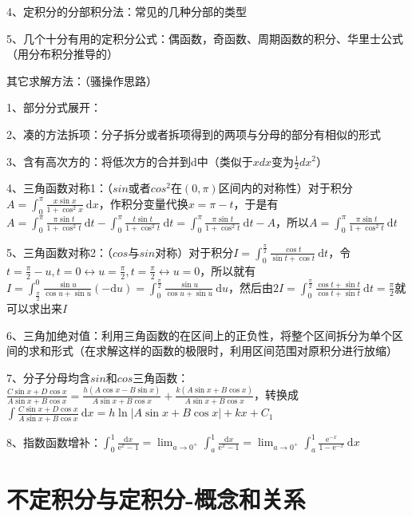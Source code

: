 4、定积分的分部积分法：常见的几种分部的类型

5、几个十分有用的定积分公式：偶函数，奇函数、周期函数的积分、华里士公式（用分布积分推导的）

其它求解方法：（骚操作思路）

1、部分分式展开：

2、凑的方法拆项：分子拆分或者拆项得到的两项与分母的部分有相似的形式

3、含有高次方的：将低次方的合并到d中（类似于$xdx$变为$\frac{1}{2}dx^2$）

4、三角函数对称1：（$sin$或者$cos^2$在$(0,\pi)$区间内的对称性）对于积分$A=\int_{0}^{\pi} \frac{x \sin x}{1+\cos ^{2} x} \mathrm{~d} x$，作积分变量代换$x=\pi-t$，于是有$A=\int_{0}^{\pi} \frac{\pi \sin t}{1+\cos ^{2} t} \mathrm{~d} t-\int_{0}^{\pi} \frac{t \sin t}{1+\cos ^{2} t} \mathrm{~d} t=\int_{0}^{\pi} \frac{\pi \sin t}{1+\cos ^{2} t} \mathrm{~d} t-A$，所以$A=\int_{0}^{\pi} \frac{\pi \sin t}{1+\cos ^{2} t} \mathrm{~d} t$

5、三角函数对称2：（$cos$与$sin$对称）对于积分$I=\int_{0}^{\frac{\pi}{2}} \frac{\cos t}{\sin t+\cos t} \mathrm{~d} t$，令$t=\frac{\pi}{2}-u, t=0 \leftrightarrow u=\frac{\pi}{2}, t=\frac{\pi}{2} \leftrightarrow u=0$，所以就有$I=\int_{\frac{\pi}{2}}^{0} \frac{\sin u}{\cos u+\sin u}(-\mathrm{d} u)=\int_{0}^{\frac{\pi}{2}} \frac{\sin u}{\cos u+\sin u} \mathrm{~d} u$，然后由$2 I=\int_{0}^{\frac{\pi}{2}} \frac{\cos t+\sin t}{\cos t+\sin t} \mathrm{~d} t=\frac{\pi}{2}$就可以求出来$I$

6、三角加绝对值：利用三角函数的在区间上的正负性，将整个区间拆分为单个区间的求和形式（在求解这样的函数的极限时，利用区间范围对原积分进行放缩）

7、分子分母均含$sin$和$cos$三角函数：$\frac{C \sin x+D \cos x}{A \sin x+B \cos x}=\frac{h(A \cos x-B \sin x)}{A \sin x+B \cos x}+\frac{k(A \sin x+B \cos x)}{A \sin x+B \cos x}$，转换成$\int \frac{C \sin x+D \cos x}{A \sin x+B \cos x} \mathrm{~d} x=h \ln |A \sin x+B \cos x|+k x+C_{1}$

8、指数函数增补：$\int_{0}^{1} \frac{\mathrm{d} x}{\mathrm{e}^{x}-1}=\lim _{a \rightarrow 0^{+}} \int_{a}^{1} \frac{\mathrm{d} x}{\mathrm{e}^{x}-1}=\lim _{a \rightarrow 0^{+}} \int_{a}^{1} \frac{\mathrm{e}^{-x}}{1-\mathrm{e}^{-x}} \mathrm{~d} x$

\section{不定积分与定积分-概念和关系}



